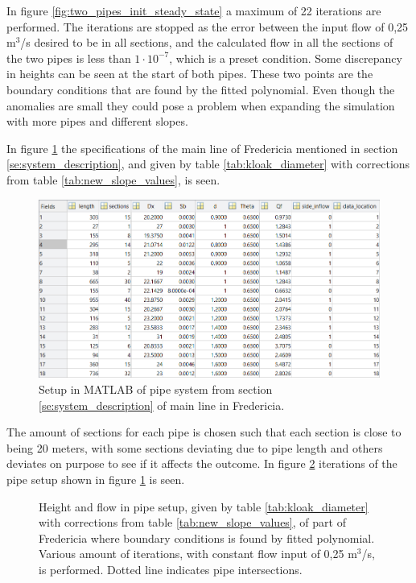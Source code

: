 In figure \ref{fig:two_pipes_init_steady_state} a maximum of 22 iterations are performed. The iterations are stopped as the error between the input flow of 0,25 $\text{m}^\text{3}$/s desired to be in all sections, and the calculated flow in all the sections of the two pipes is less than $1\cdot10^{-7}$, which is a preset condition. 
Some discrepancy in heights can be seen at the start of both pipes. These two points are the boundary conditions that are found by the fitted polynomial. Even though the anomalies are small they could pose a problem when expanding the simulation with more pipes and different slopes. 

In figure \ref{fig:Fredericia_pipe_setup} the specifications of the main line of Fredericia mentioned in section \ref{se:system_description}, and given by table \ref{tab:kloak_diameter} with corrections from table \ref{tab:new_slope_values}, is seen.

\begin{figure}[H]
\centering
\includegraphics[width=0.97 \textwidth]{report/simulation/pictures/Fredericia_pipe_setup2.PNG}
\caption{Setup in MATLAB of pipe system from section \ref{se:system_description} of main line in Fredericia.}
\label{fig:Fredericia_pipe_setup}
\end{figure}

The amount of sections for each pipe is chosen such that each section is close to being 20 meters, with some sections deviating due to pipe length and others deviates on purpose to see if it affects the outcome.  
In figure \ref{fig:fredericia_init_steady_state} iterations of the pipe setup shown in figure \ref{fig:Fredericia_pipe_setup} is seen. 

\begin{figure}[H]
 \centering
 
\caption{Height and flow in pipe setup, given by table \ref{tab:kloak_diameter} with corrections from table \ref{tab:new_slope_values}, of part of Fredericia where boundary conditions is found by fitted polynomial. Various amount of iterations, with constant flow input of 0,25 $\text{m}^\text{3}$/s, is performed. Dotted line indicates pipe intersections.}
\label{fig:fredericia_init_steady_state}
\end{figure}

